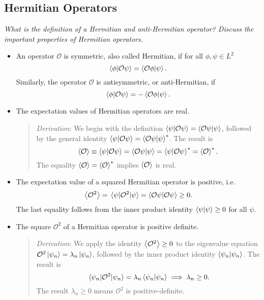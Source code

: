 \documentclass[11pt, a4paper]{article}
\newcommand{\Herm}{Hermitian\xspace}
\renewcommand{\O}{\mathcal{O}}  %
\newcommand{\p}{\psi}  %
\begin{document}
\subsection{Hermitian Operators}
\textit{What is the definition of a \Herm and anti-\Herm operator? Discuss the important properties of \Herm operators.}
\begin{itemize}
	\item An operator $ \O $ is symmetric, also called \Herm, if for all $ \phi, \psi \in L^{2} $ 
	\begin{equation*}
		\braket{\phi}{\O \p} = \braket{\O\phi}{\p}.
	\end{equation*}
	Similarly, the operator $ \O $ is antisymmetric, or anti-Hermitian, if
	\begin{equation*}
		\braket{\phi}{\O \p} = - \braket{\O \phi}{\p}.
	\end{equation*}
	
	\item The expectation values of Hermitian operators are real. 

    \begin{quote}
        \textit{Derivation}: We begin with the definition $ \braket{\p}{\O \p} = \braket{\O \p}{\p} $, followed by the general identity $ \braket{\p}{\O \p} = \braket{\O \p}{\p}^{*} $. The result is
        \begin{equation*}
            \ev{\O} \equiv \braket{\psi}{\O \psi} = \braket{\O \psi}{\psi} = 		\braket{\psi}{\O \psi}^{*} = \ev{\O}^{*}.
        \end{equation*}
        The equality $ \ev{\O} = \ev{\O}^{*} $ implies $ \ev{\O} $ is real.
    \end{quote}	

	\item The expectation value of a squared \Herm operator is positive, i.e.
	\begin{equation*}
		\ev{\O^{2}} = \mel{\p}{\O^{2}}{\p} = \braket{\O \p}{\O \p}\geq 0.
	\end{equation*}
    The last equality follows from the inner product identity $ \braket{\psi}{\psi} \geq 0 $ for all $ \psi $.

	\item The square $ \O^{2} $ of a \Herm operator is positive definite.
    \begin{quote}
        \textit{Derivation}: We apply the identity $ \ev{\O^{2}} \geq 0 $ to the eigenvalue equation $ \O^{2} \ket{\psi_{n}} = \lambda_{n}\ket{\psi_{n}} $, followed by the inner product identity $ \braket{\psi_{n}}{\psi_{n}} $. The result is
        \begin{equation*}
            \mel{\p_{n}}{\O^{2}}{\p_{n}} = \lambda_{n}\braket{\psi_{n}}{\p_{n}} \implies \lambda_{n} \geq 0.
        \end{equation*}
        The result $ \lambda_{n} \geq 0 $ means $ \O^{2} $ is positive-definite.
    \end{quote}


\end{itemize}
\end{document}
